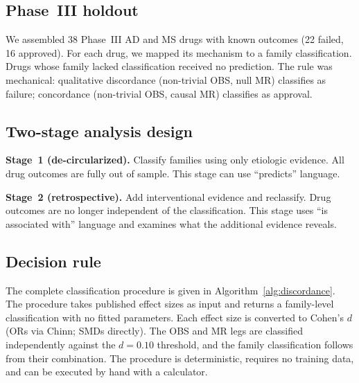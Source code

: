 \documentclass[11pt]{article}
\begin{document}
\subsection{Phase~III holdout}

We assembled 38 Phase~III AD and MS drugs with known outcomes (22 failed, 16 approved). For each drug, we mapped its mechanism to a family classification. Drugs whose family lacked classification received no prediction. The rule was mechanical: qualitative discordance (non-trivial OBS, null MR) classifies as failure; concordance (non-trivial OBS, causal MR) classifies as approval.

\subsection{Two-stage analysis design}

\textbf{Stage~1 (de-circularized).} Classify families using only etiologic evidence. All drug outcomes are fully out of sample. This stage can use ``predicts'' language.

\textbf{Stage~2 (retrospective).} Add interventional evidence and reclassify. Drug outcomes are no longer independent of the classification. This stage uses ``is associated with'' language and examines what the additional evidence reveals.

\subsection{Decision rule}

The complete classification procedure is given in Algorithm~\ref{alg:discordance}. The procedure takes published effect sizes as input and returns a family-level classification with no fitted parameters. Each effect size is converted to Cohen's $d$ (ORs via Chinn; SMDs directly). The OBS and MR legs are classified independently against the $d = 0.10$ threshold, and the family classification follows from their combination. The procedure is deterministic, requires no training data, and can be executed by hand with a calculator.
\end{document}
